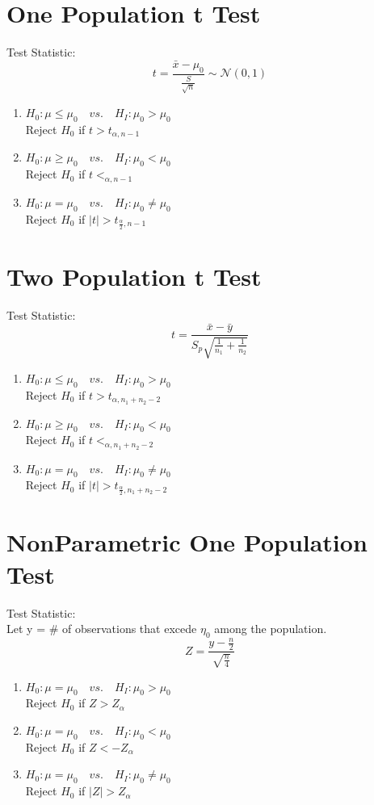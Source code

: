 \documentclass[10pt]{article}
\newcommand{\mean}[1]{\bar{#1}}
\newcommand{\pN}[2]{\mathcal{N}(#1, #2)}
\newcommand{\abs}[1]{\lvert#1\rvert}
\begin{document}
\begin{multicols}{2}
\section*{One Population t Test}
Test Statistic:\\
$$t = \frac{\mean{x}-\mu_{0}}{\frac{S}{\sqrt{n}}} \sim \pN{0}{1}$$
\begin{enumerate}
	\item $H_{0}:\mu\leq\mu_{0}\quad vs. \quad H_{I}:\mu_{0}>\mu_{0}$
	\\Reject $H_{0}$ if $t > t_{\alpha, n-1}$
	\item $H_{0}:\mu\geq\mu_{0}\quad vs. \quad H_{I}:\mu_{0}<\mu_{0}$
	\\Reject $H_{0}$ if $t < _{\alpha, n-1}$
	\item $H_{0}:\mu = \mu_{0}\quad vs. \quad H_{I}:\mu_{0}\neq\mu_{0}$
	\\Reject $H_{0}$ if $\abs{t} > t_{\frac{\alpha}{2}, n-1}$
\end{enumerate}

\section*{Two Population t Test}
Test Statistic:\\
$$t = \frac{\mean{x}-\mean{y}}{S_p\sqrt{\frac{1}{n_{1}}+\frac{1}{n_{2}}}}$$
\begin{enumerate}
	\item $H_{0}:\mu\leq\mu_{0}\quad vs. \quad H_{I}:\mu_{0}>\mu_{0}$
	\\Reject $H_{0}$ if $t > t_{\alpha, n_{1}+n_{2}-2}$
	\item $H_{0}:\mu\geq\mu_{0}\quad vs. \quad H_{I}:\mu_{0}<\mu_{0}$
	\\Reject $H_{0}$ if $t < _{\alpha, n_{1}+n_{2}-2}$
	\item $H_{0}:\mu = \mu_{0}\quad vs. \quad H_{I}:\mu_{0}\neq\mu_{0}$
	\\Reject $H_{0}$ if $\abs{t} > t_{\frac{\alpha}{2}, n_{1}+n_{2}-2}$
\end{enumerate}

\section*{NonParametric One Population Test}
Test Statistic:\\
Let y = \# of observations that excede $\eta_{0}$ among the population.\\
$$Z = \frac{y-\frac{n}{2}}{\sqrt{\frac{n}{4}}}$$
\begin{enumerate}
	\item $H_{0}:\mu=\mu_{0}\quad vs. \quad H_{I}:\mu_{0}>\mu_{0}$
	\\Reject $H_{0}$ if $Z > Z_{\alpha}$
	\item $H_{0}:\mu=\mu_{0}\quad vs. \quad H_{I}:\mu_{0}<\mu_{0}$
	\\Reject $H_{0}$ if $Z < -Z_{\alpha}$
	\item $H_{0}:\mu=\mu_{0}\quad vs. \quad H_{I}:\mu_{0}\neq\mu_{0}$
	\\Reject $H_{0}$ if $\abs{Z} > Z_{\alpha}$
\end{enumerate}


\end{multicols}
\end{document}
